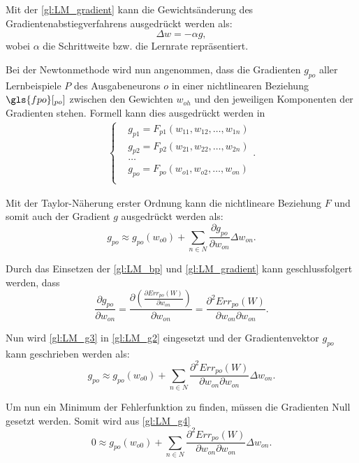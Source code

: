 Mit der \autoref{gl:LM_gradient} kann die Gewichtsänderung des Gradientenabstiegverfahrens ausgedrückt werden als:
\begin{equation}
\Delta w= - \alpha g,
\label{gl:LM_bp_delta-w}
\end{equation}
wobei $\alpha$ die Schrittweite bzw. die Lernrate repräsentiert.

Bei der Newtonmethode wird nun angenommen, dass die Gradienten $g_{po}$ aller Lernbeispiele $P$ des Ausgabeneurons $o$ in einer nichtlinearen Beziehung $\gls{fpo}[_{po}]$ zwischen den Gewichten $w_{oh}$ und den jeweiligen Komponenten der Gradienten stehen. Formell kann dies ausgedrückt werden in
\begin{align}
\left \{
\begin{aligned}
&g_{p1}= F_{p1}(w_{11},w_{12},\dots, w_{1n})\\ 
&g_{p2}= F_{p2}(w_{21},w_{22},\dots, w_{2n})\\
&\dots\\
&g_{po}= F_{po}(w_{o1},w_{o2},\dots, w_{on})\\
\end{aligned}
.
\right.
\label{gl:LM_g1}
\end{align}

Mit der Taylor-Näherung erster Ordnung kann die nichtlineare Beziehung $F$ und somit auch der Gradient $g$ ausgedrückt werden als:
\begin{equation}
g_{po} \approx g_{po}(w_{o0}) + \sum\limits_{n \in N} \frac{\partial g_{po}}{\partial w_{on}} \Delta w_{on}.
\label{gl:LM_g2}
\end{equation}

Durch das Einsetzen der \autoref{gl:LM_bp} und \autoref{gl:LM_gradient} kann geschlussfolgert werden, dass
\begin{equation}
\frac{\partial g_{po}}{\partial w_{on}} = \frac{\partial \left ( \frac{\partial Err_{po}(W)}{\partial w_{on}} \right )}{\partial w_{on}} = \frac{\partial^2  Err_{po}(W)}{\partial w_{on} \partial w_{on}}.
\label{gl:LM_g3}
\end{equation}

Nun wird \autoref{gl:LM_g3} in \autoref{gl:LM_g2} eingesetzt und der Gradientenvektor $g_{po}$ kann geschrieben werden als:
\begin{equation}
g_{po} \approx g_{po}(w_{o0}) + \sum\limits_{n \in N} \frac{\partial^2 Err_{po}(W)}{\partial w_{on} \partial w_{on}} \Delta w_{on} .
\label{gl:LM_g4}
\end{equation}

Um nun ein Minimum der Fehlerfunktion zu finden, müssen die Gradienten Null gesetzt werden. Somit wird aus \autoref{gl:LM_g4}
\begin{equation}
0 \approx g_{po}(w_{o0}) + \sum\limits_{n \in N} \frac{\partial^2 Err_{po}(W)}{\partial w_{on} \partial w_{on}} \Delta w_{on} .
\label{gl:LM_g5}
\end{equation}

